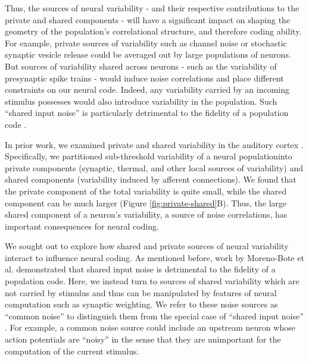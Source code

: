 \documentclass[12pt]{article}
\begin{document}
Thus, the sources of neural variability - and their respective contributions to the private and shared components - will have a significant impact on shaping the geometry of the population's correlational structure, and therefore coding ability. For example, private sources of variability such as channel noise or stochastic synaptic vesicle release could be averaged out by large populations of neurons. But sources of variability shared across neurons - such as the variability of presynaptic spike trains - would induce noise correlations and place different constraints on our neural code.  Indeed, any variability carried by an incoming stimulus possesses would also introduce variability in the population. Such ``shared input noise'' is particularly detrimental to the fidelity of a population code \citep{morenobote2014}.

In prior work, we examined private and shared variability in the auditory cortex \citep{deweese2004}. Specifically, we partitioned sub-threshold variability of a neural populationinto private components (synaptic, thermal, and other local sources of variability) and shared components (variability induced by afferent connections). We found that the private component of the total variability is quite small, while the shared component can be much larger (Figure \ref{fig:private-shared}B). Thus, the large shared component of a neuron's variability, a source of noise correlations, has important consequences for neural coding.

We sought out to explore how shared and private sources of neural variability interact to influence neural coding. As mentioned before, work by Moreno-Bote et al. demonstrated that shared input noise is detrimental to the fidelity of a population code. Here, we instead turn to sources of shared variability which are not carried by stimulus and thus can be manipulated by features of neural computation such as synaptic weighting. We refer to these noise sources as ``common noise'' to distinguish them from the special case of ``shared input noise'' \citep{vidne2012}. For example, a common noise source could include an upstream neuron whose action potentials are ``noisy'' in the sense that they are unimportant for the computation of the current stimulus.
\end{document}
